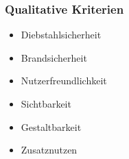 \subsubsection{Qualitative Kriterien}

\begin{itemize}
  \item Diebstahlsicherheit
  \item Brandsicherheit
  \item Nutzerfreundlichkeit
  \item Sichtbarkeit
  \item Gestaltbarkeit
  \item Zusatznutzen
\end{itemize}